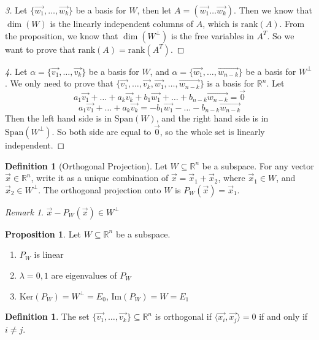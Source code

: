 \documentclass{article}
\theoremstyle{definition}
\newtheorem{proposition}[theorem]{Proposition}
\newtheorem{definition}[theorem]{Definition}
\theoremstyle{remark}
\newtheorem{remark}[theorem]{Remark}
\begin{document}
\begin{proof}[3]
    Let $\{\vec{w_1},\dots,\vec{w_k}\}$ be a basis for $W$, then let $A=(\vec{w_1}\dots\vec{w_k})$.
    Then we know that $\dim(W)$ is the linearly independent columns of $A$, which is $\text{rank}(A)$.
    From the proposition, we know that $\dim(W^{\perp})$ is the free variables in $A^{T}$.
    So we want to prove that $\text{rank}(A)=\text{rank}(A^T)$.
\end{proof}

\begin{proof}[4]
    Let $\alpha=\{\vec{v_1},\dots,\vec{v_k}\}$ be a basis for $W$, and $\alpha=\{\vec{w_1},\dots,\vec{w_{n-k}}\}$ be a basis for $W^\perp$.
    We only need to prove that $\{\vec{v_1},\dots,\vec{v_k}, \vec{w_1},\dots,\vec{w_{n-k}}\}$ is a basis for $\mathbb{R}^n$.
    Let 
    \[
    a_1\vec{v_1}+\dots+a_k\vec{v_k}+b_1\vec{w_1}+\dots+b_{n-k}\vec{w_{n-k}}=\vec{0}
    \]
    \[
    a_1\vec{v_1}+\dots+a_k\vec{v_k}=-b_1\vec{w_1}-\dots-b_{n-k}\vec{w_{n-k}}
    \]
    Then the left hand side is in $\text{Span}(W)$, and the right hand side is in $\text{Span}(W^{\perp})$.
    So both side are equal to $\vec{0}$, so the whole set is linearly independent.
\end{proof}

\begin{definition}[Orthogonal Projection]
    Let $W\subseteq \mathbb{R}^n$ be a subspace.
For any vector $\vec{x}\in\mathbb{R}^n$, write it as a unique combination of $\vec{x}=\vec{x}_1+\vec{x}_2$, where $\vec{x}_1\in W$, and $\vec{x}_2\in W^{\perp}$.
The orthogonal projection onto $W$ is $P_{W}(\vec{x})=\vec{x}_1$.
\end{definition}

\begin{remark}
    $\vec{x}-P_W(\vec{x})\in W^{\perp}$
\end{remark}

\begin{proposition}
Let $W\subseteq \mathbb{R}^n$ be a subspace.
    \begin{enumerate}
        \item $P_W$ is linear
        \item $\lambda=0,1$ are eigenvalues of $P_W$
        \item $\text{Ker}(P_W)=W^{\perp}=E_0$, $\text{Im}(P_W)=W=E_1$
    \end{enumerate}
\end{proposition}

\begin{definition}
    The set $\{\vec{v_1},\dots,\vec{v_k}\}\subseteq\mathbb{R}^n$ is orthogonal if $\langle \vec{x_i},\vec{x_j}\rangle=0$ if and only if $i\neq j$.
\end{definition}
\end{document}
